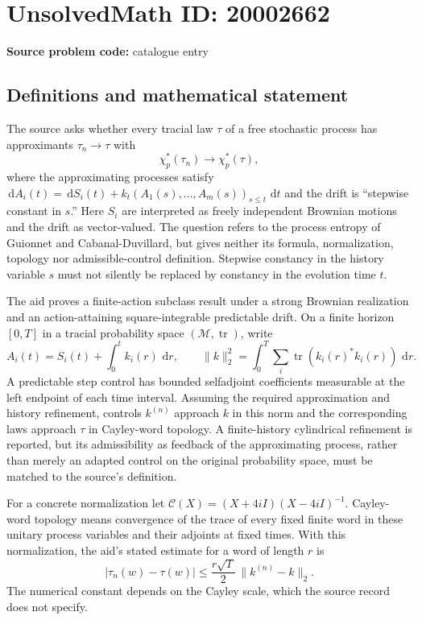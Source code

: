 \documentclass[11pt]{article}
\newcommand{\dd}{\,\mathrm{d}}
\begin{document}
\section*{UnsolvedMath ID: 20002662}
\textbf{Source problem code:} catalogue entry
\subsection{Definitions and mathematical statement}
The source asks whether every tracial law $\tau$ of a free stochastic process has approximants $\tau_n\to\tau$ with
\[
\chi_p^*(\tau_n)\to\chi_p^*(\tau),
\]
where the approximating processes satisfy $\dd A_i(t)=\dd S_i(t)+k_t(A_1(s),\ldots,A_m(s))_{s\leq t}\,\dd t$ and the drift is ``stepwise constant in $s$.'' Here $S_i$ are interpreted as freely independent Brownian motions and the drift as vector-valued. The question refers to the process entropy of Guionnet and Cabanal-Duvillard, but gives neither its formula, normalization, topology nor admissible-control definition. Stepwise constancy in the history variable $s$ must not silently be replaced by constancy in the evolution time $t$.

The aid proves a finite-action subclass result under a strong Brownian realization and an action-attaining square-integrable predictable drift. On a finite horizon $[0,T]$ in a tracial probability space $(\mathcal M,\operatorname{tr})$, write
\[
A_i(t)=S_i(t)+\int_0^t k_i(r)\,\dd r,
\qquad
\|k\|_2^2=\int_0^T\sum_i\operatorname{tr}(k_i(r)^*k_i(r))\,\dd r.
\]
A predictable step control has bounded selfadjoint coefficients measurable at the left endpoint of each time interval. Assuming the required approximation and history refinement, controls $k^{(n)}$ approach $k$ in this norm and the corresponding laws approach $\tau$ in Cayley-word topology. A finite-history cylindrical refinement is reported, but its admissibility as feedback of the approximating process, rather than merely an adapted control on the original probability space, must be matched to the source's definition.

For a concrete normalization let $\mathcal C(X)=(X+4iI)(X-4iI)^{-1}$. Cayley-word topology means convergence of the trace of every fixed finite word in these unitary process variables and their adjoints at fixed times. With this normalization, the aid's stated estimate for a word of length $r$ is
\[
|\tau_n(w)-\tau(w)|\leq\frac{r\sqrt T}{2}\,\|k^{(n)}-k\|_2.
\]
The numerical constant depends on the Cayley scale, which the source record does not specify.
\end{document}
